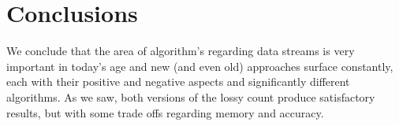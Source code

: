 \documentclass[...]{revdetua}
\begin{document}
\section{Conclusions}
We conclude that the area of algorithm's regarding data streams is very important in today's age and new (and even old) approaches surface constantly, each with their positive and negative aspects and significantly different algorithms. As we saw, both versions of the lossy count produce satisfactory results, but with some trade offs regarding memory and accuracy.


\end{document}
